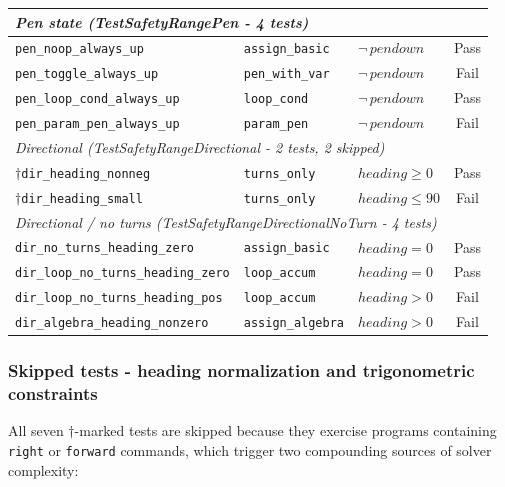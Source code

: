 {\begin{longtable}{p{} p{} p{} c}
\midrule
\multicolumn{4}{l}{\textit{Pen state (TestSafetyRangePen - 4 tests)}} \\
\midrule
\texttt{pen\_noop\_always\_up}             & \texttt{assign\_basic}   & $\neg\,\mathit{pendown}$  & Pass \\
\texttt{pen\_toggle\_always\_up}           & \texttt{pen\_with\_var}  & $\neg\,\mathit{pendown}$  & Fail \\
\texttt{pen\_loop\_cond\_always\_up}       & \texttt{loop\_cond}      & $\neg\,\mathit{pendown}$  & Pass \\
\texttt{pen\_param\_pen\_always\_up}       & \texttt{param\_pen}      & $\neg\,\mathit{pendown}$  & Fail \\

\midrule
\multicolumn{4}{l}{\textit{Directional (TestSafetyRangeDirectional - 2 tests, 2 skipped)}} \\
\midrule
$\dagger$\;\texttt{dir\_heading\_nonneg}   & \texttt{turns\_only}     & $\mathit{heading} \geq 0$ & Pass \\
$\dagger$\;\texttt{dir\_heading\_small}    & \texttt{turns\_only}     & $\mathit{heading} \leq 90$& Fail \\

\midrule
\multicolumn{4}{l}{\textit{Directional / no turns (TestSafetyRangeDirectionalNoTurn - 4 tests)}} \\
\midrule
\texttt{dir\_no\_turns\_heading\_zero}     & \texttt{assign\_basic}   & $\mathit{heading} = 0$   & Pass \\
\texttt{dir\_loop\_no\_turns\_heading\_zero} & \texttt{loop\_accum}   & $\mathit{heading} = 0$   & Pass \\
\texttt{dir\_loop\_no\_turns\_heading\_pos} & \texttt{loop\_accum}    & $\mathit{heading} > 0$   & Fail \\
\texttt{dir\_algebra\_heading\_nonzero}    & \texttt{assign\_algebra} & $\mathit{heading} > 0$   & Fail \\

\end{longtable}
}

\subsubsection*{Skipped tests - heading normalization and trigonometric constraints}

All seven $\dagger$-marked tests are skipped because they exercise programs
containing \texttt{right} or \texttt{forward} commands, which trigger two
compounding sources of solver complexity:

